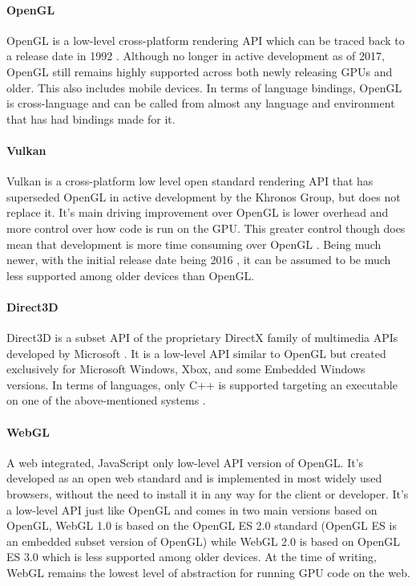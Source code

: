 \paragraph{OpenGL}
OpenGL is a low-level cross-platform rendering API which can be traced back to a release date in 1992 \cite[]{wiki:opengl}. Although no longer in active development as of 2017, OpenGL still remains highly supported across both newly releasing GPUs and older. This also includes mobile devices. In terms of language bindings, OpenGL is cross-language and can be called from almost any language and environment that has had bindings made for it. \cite[]{segal_2022_the}

\paragraph{Vulkan}
Vulkan is a cross-platform low level open standard rendering API that has superseded OpenGL in active development by the Khronos Group, but does not replace it. It’s main driving improvement over OpenGL is lower overhead and more control over how code is run on the GPU. This greater control though does mean that development is more time consuming over OpenGL \cite[]{Vulkan}. Being much newer, with the initial release date being 2016 \cite[]{khronosgroup_2016_khronos}, it can be assumed to be much less supported among older devices than OpenGL.

\paragraph{Direct3D}
Direct3D is a subset API of the proprietary DirectX family of multimedia APIs developed by Microsoft \cite[]{grantmestrength_2021_direct3d}. It is a low-level API similar to OpenGL but created exclusively for Microsoft Windows, Xbox, and some Embedded Windows versions. In terms of languages, only C++ is supported targeting an executable on one of the above-mentioned systems \cite[]{stevewhims_2021_direct3d}.

\paragraph{WebGL}
A web integrated, JavaScript only low-level API version of OpenGL. It’s developed as an open web standard and is implemented in most widely used browsers, without the need to install it in any way for the client or developer. It’s a low-level API just like OpenGL and comes in two main versions based on OpenGL, WebGL 1.0 is based on the OpenGL ES 2.0 standard (OpenGL ES is an embedded subset version of OpenGL) while WebGL 2.0 is based on OpenGL ES 3.0 which is less supported among older devices. At the time of writing, WebGL remains the lowest level of abstraction for running GPU code on the web. \cite[]{mozilla_2019_webgl} \cite[]{khronosgroup_2011_webgl}

